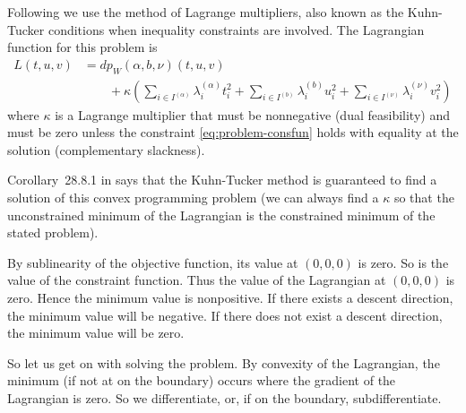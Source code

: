 Following \citet{reaster-tr,reaster} we use the method of Lagrange multipliers,
also known as the Kuhn-Tucker conditions when inequality constraints
are involved.  The Lagrangian function for this problem is
\begin{equation} \label{eq:problem-lagrangian}
\begin{split}
   L(t, u, v) & = d p_W(\alpha, b, \nu)(t, u, v)
   \\
   & \qquad
   + \kappa \left( \sum_{i \in I^{(\alpha)}} \lambda^{(\alpha)}_i t_i^2
   + \sum_{i \in I^{(b)}} \lambda^{(b)}_i u_i^2
   + \sum_{i \in I^{(\nu)}} \lambda^{(\nu)}_i v_i^2 \right)
\end{split}
\end{equation}
where $\kappa$ is a Lagrange multiplier that must be nonnegative
(dual feasibility) and must be zero unless the constraint
\eqref{eq:problem-consfun} holds with equality at the solution
(complementary slackness).

Corollary~{28.8.1} in \citet{rockafellar} says that the Kuhn-Tucker method
is guaranteed to find a solution of this convex programming
problem (we can always find a $\kappa$ so that the unconstrained minimum of
the Lagrangian is the constrained minimum of the stated problem).

By sublinearity of the objective function, its value at $(0, 0, 0)$ is
zero.  So is the value of the constraint function.  Thus the value of
the Lagrangian at $(0, 0, 0)$ is zero.  Hence the minimum value is nonpositive.
If there exists a descent direction, the minimum value will be negative.
If there does not exist a descent direction, the minimum value will be zero.

So let us get on with solving the problem.  By convexity of the Lagrangian,
the minimum (if not at on the boundary) occurs where the gradient of the
Lagrangian is zero.
So we differentiate, or, if on the boundary, subdifferentiate.

